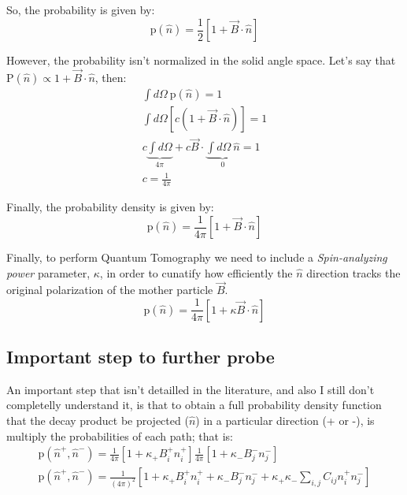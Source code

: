 \documentclass[onecolumn, amsmath, amssymb, aps, prd]{revtex4-2}
\begin{document}
		So, the probability is given by:
		\begin{equation}
			\text{p}(\hat{n}) = \frac{1}{2} \left[ 1 + \vec{B}\cdot \hat{n} \right]
		\end{equation}

		However, the probability isn't normalized in the solid angle space. Let's say that $\text{P} (\hat{n}) \propto 1 +\vec{B}\cdot \hat{n}$, then:
		\begin{align}
			\int d\Omega \ \text{p} (\hat{n}) = 1 \\
			\int d\Omega \left[ c (1+\vec{B}\cdot\hat{n}) \right] = 1 \\
			c \underbrace{\int d\Omega}_{4\pi} + c\vec{B} \cdot \underbrace{\int d\Omega \ \hat{n}}_{0} = 1 \\
			c = \frac{1}{4\pi}
		\end{align}

		Finally, the probability density is given by:
		\begin{equation}
			\text{p} (\hat{n}) = \frac{1}{4\pi} \left[ 1 + \vec{B} \cdot \hat{n} \right]
		\end{equation}

		Finally, to perform Quantum Tomography we need to include a \textit{Spin-analyzing power} parameter, $\kappa$, in order to cunatify how efficiently the $\hat{n}$ direction tracks the original polarization of the mother particle $\vec{B}$.
		\begin{equation} \label{eq3}
			\text{p}(\hat{n}) = \frac{1}{4\pi} \left[ 1 + \kappa \vec{B} \cdot \hat{n} \right]
		\end{equation}

	\subsection{Important step to further probe}
		An important step that isn't detailled in the literature, and also I still don't completelly understand it, is that to obtain a full probability density function that the decay product be projected ($\hat{n}$) in a particular direction (+ or -), is multiply the probabilities of each path; that is:
		\begin{align}
			\text{p}(\hat{n}^+, \hat{n}^-) = \frac{1}{4\pi} \left[ 1+\kappa_+ B_i^+ n_i^+ \right] \frac{1}{4\pi} \left[ 1 + \kappa_- B_j^- n_j^- \right] \\
			\text{p}(\hat{n}^+, \hat{n}^-) = \frac{1}{(4\pi)^2} \left[ 1 + \kappa_+ B_i^+ n_i^+ + \kappa_- B_j^- n_j^- + \kappa_+ \kappa_- \sum_{i,j} C_{ij} n_i^+ n_j^- \right]
		\end{align}
\end{document}
